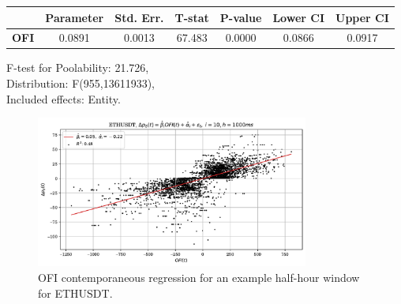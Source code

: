 \begin{table}
\begin{center}
\begin{tabular}{lclc}
\hline
\end{tabular}
\begin{tabular}{lcccccc}
             & \textbf{Parameter} & \textbf{Std. Err.} & \textbf{T-stat} & \textbf{P-value} & \textbf{Lower CI} & \textbf{Upper CI}  \\
\hline
\textbf{OFI} &       0.0891       &       0.0013       &      67.483     &      0.0000      &       0.0866      &       0.0917       \\
\hline
\end{tabular}
\end{center}
F-test for Poolability: 21.726, \\
Distribution: F(955,13611933), \\
Included effects: Entity.
\end{table}

\begin{figure}[htpb]
    \centering
    \includegraphics[width=0.8\textwidth]{./images/ethusdt_h=1000ms_contemp_OFI.pdf}
    \caption{OFI contemporaneous regression for an example half-hour window for ETHUSDT.}
\end{figure}
\clearpage




